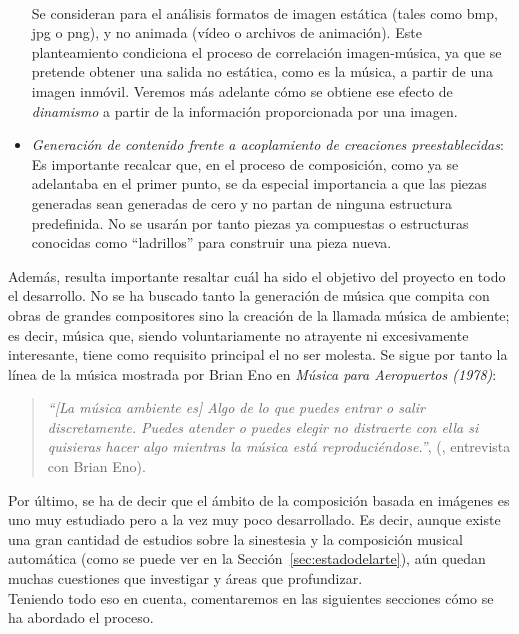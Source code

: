 \begin{itemize}
			\vspace{0.1in}
			\\Se consideran para el análisis formatos de imagen estática (tales como bmp, jpg o png), y no animada (vídeo o archivos de animación). Este planteamiento condiciona el proceso de correlación imagen-música, ya que se pretende obtener una salida no estática, como es la música, a partir de una imagen inmóvil. Veremos más adelante cómo se obtiene ese efecto de \emph{dinamismo} a partir de la información proporcionada por una imagen.
		\item \emph{Generación de contenido frente a acoplamiento de creaciones preestablecidas}:
			\vspace{0.1in}
			\\Es importante recalcar que, en el proceso de composición, como ya se adelantaba en el primer punto, se da especial importancia a que las piezas generadas sean generadas de cero y no partan de ninguna estructura predefinida. No se usarán por tanto piezas ya compuestas o estructuras conocidas como ``ladrillos'' para construir una pieza nueva.
		\end{itemize}
		
		Además, resulta importante resaltar cuál ha sido el objetivo del proyecto en todo el desarrollo. No se ha buscado tanto la generación de música que compita con obras de grandes compositores sino la creación de la llamada música de ambiente; es decir, música que, siendo voluntariamente no atrayente ni excesivamente interesante, tiene como requisito principal el no ser molesta. Se sigue por tanto la línea de la música mostrada por Brian Eno en \emph{Música para Aeropuertos (1978)}:
		
		\begin{quote}
		\emph{``[La música ambiente es] Algo de lo que puedes entrar o salir discretamente. Puedes atender o puedes elegir no distraerte con ella si quisieras hacer algo mientras la música está reproduciéndose.''}, (\cite{BrianEnoInterview}, entrevista con Brian Eno).
		\end{quote}		
		
		Por último, se ha de decir que el ámbito de la composición basada en imágenes es uno muy estudiado pero a la vez muy poco desarrollado. Es decir, aunque existe una gran cantidad de estudios sobre la sinestesia y la composición musical automática (como se puede ver en la Sección~\ref{sec:estadodelarte}), aún quedan muchas cuestiones que investigar y áreas que profundizar.\\
		
		Teniendo todo eso en cuenta, comentaremos en las siguientes secciones cómo se ha abordado el proceso.
		



